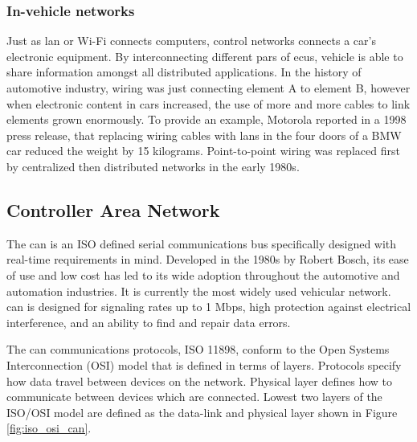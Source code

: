 \subsubsection{In-vehicle networks} %
\label{ssub:in_vehicle_networks}
Just as \gls{lan} or Wi-Fi connects computers, control networks connects a car's electronic equipment. By interconnecting different pars of \glspl{ecu}, vehicle is able to share information amongst all distributed applications. In the history of automotive industry, wiring was just connecting element A to element B, however when electronic content in cars increased, the use of more and more cables to link elements grown enormously. To provide an example, Motorola reported in a 1998 press release, that replacing wiring cables with \gls{lan}s in the four doors of a BMW car reduced the weight by 15 kilograms.\cite{976923} Point-to-point wiring was replaced first by centralized then distributed networks in the early 1980s.\cite{815878}
\subsection{Controller Area Network} %
\label{sub:controller_area_network}
The \gls{can} is an ISO defined serial communications bus specifically designed with real-time requirements in mind. Developed in the 1980s by Robert Bosch, its ease of use and low cost has led to its wide adoption throughout the automotive and automation industries\cite{788104}. It is currently the most widely used vehicular network\cite{976923}. \gls{can} is designed for signaling rates up to 1 Mbps, high protection against electrical interference, and an ability to find and repair data errors.

The \gls{can} communications protocols, ISO 11898, conform to the Open Systems Interconnection (OSI) model that is defined in terms of layers\cite{5116731}. Protocols specify how data travel between devices on the network. Physical layer defines how to communicate between devices which are connected. Lowest two layers of the ISO/OSI model are defined as the data-link and physical layer shown in Figure \ref{fig:iso_osi_can}.

